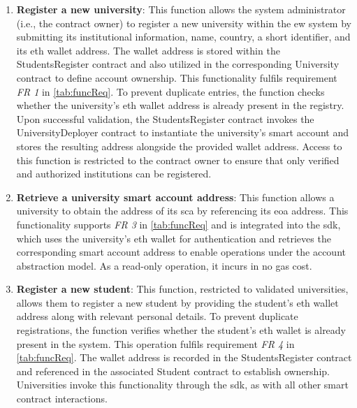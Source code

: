 \begin{enumerate}
    \item \textbf{Register a new university}: This function allows the system administrator (i.e., the contract owner) to register a new university within the \acrshort{ew} system by submitting its institutional information, name, country, a short identifier, and its \acrlong{eth} wallet address. The wallet address is stored within the StudentsRegister contract and also utilized in the corresponding University contract to define account ownership. This functionality fulfils requirement \textit{FR 1} in \cref{tab:funcReq}. To prevent duplicate entries, the function checks whether the university's \acrlong{eth} wallet address is already present in the registry. Upon successful validation, the StudentsRegister contract invokes the UniversityDeployer contract to instantiate the university’s smart account and stores the resulting address alongside the provided wallet address. Access to this function is restricted to the contract owner to ensure that only verified and authorized institutions can be registered.

    \item \textbf{Retrieve a university smart account address}: This function allows a university to obtain the address of its \acrshort{sca} by referencing its \acrshort{eoa} address. This functionality supports \textit{FR 3} in \cref{tab:funcReq} and is integrated into the \acrshort{sdk}, which uses the university's \acrlong{eth} wallet for authentication and retrieves the corresponding smart account address to enable operations under the account abstraction model. As a read-only operation, it incurs in no gas cost.
    
    \item \textbf{Register a new student}: This function, restricted to validated universities, allows them to register a new student by providing the student's \acrlong{eth} wallet address along with relevant personal details. To prevent duplicate registrations, the function verifies whether the student's \acrshort{eth} wallet is already present in the system. This operation fulfils requirement \textit{FR 4} in \cref{tab:funcReq}. The wallet address is recorded in the StudentsRegister contract and referenced in the associated Student contract to establish ownership. Universities invoke this functionality through the \acrshort{sdk}, as with all other smart contract interactions.
    

\end{enumerate}
